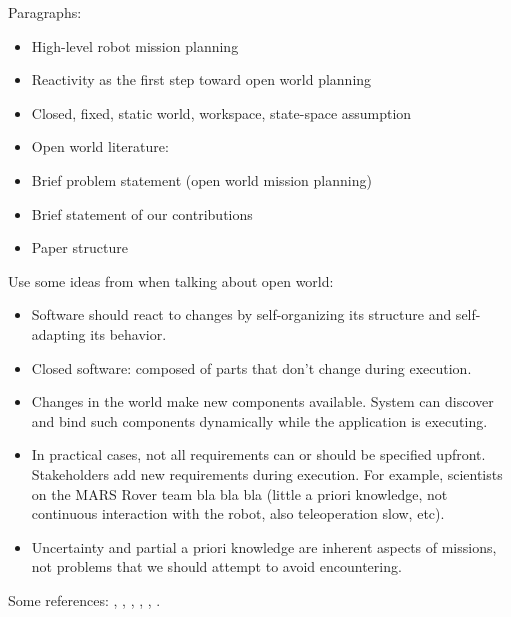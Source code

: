 Paragraphs:
\begin{itemize}
	\item High-level robot mission planning
	\item Reactivity as the first step toward open world planning
  	\item Closed, fixed, static world, workspace, state-space assumption
 	\item Open world literature: \cite{MatthiasAI2010}
	\item Brief problem statement (open world mission planning)
   	\item Brief statement of our contributions
   	\item Paper structure
\end{itemize}

Use some ideas from \cite{open-world-sw} when talking about open world:
\begin{itemize}
	\item Software should react to changes by self-organizing its structure and self-adapting its behavior.
	\item Closed software: composed of parts that don't change during execution.
	\item Changes in the world make new components available. System can discover and bind such components dynamically while the application is executing.
	\item In practical cases, not all requirements can or should be specified upfront. Stakeholders add new requirements during execution. For example, scientists on the MARS Rover team bla bla bla (little a priori knowledge, not continuous interaction with the robot, also teleoperation slow, etc).
	\item Uncertainty and partial a priori knowledge are inherent aspects of missions, not problems that we should attempt to avoid encountering.
\end{itemize}

Some references: \cite{MurrayICRA2012}, \cite{MurrayICRA2013a},  \cite{BeltaICRA2012}, \cite{Dimos2013ICRA}, \cite{Belta2013RSS}, \cite{BingxinRSS2012}.
